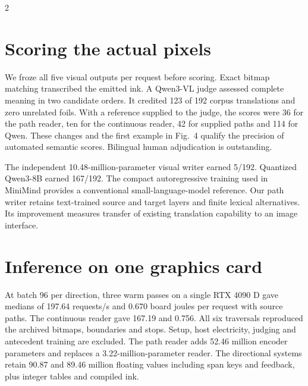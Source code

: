 \documentclass[10pt,a4paper]{article}
\newcommand{\pageheading}[1]{\noindent{\sffamily\bfseries\fontsize{17}{20}\selectfont #1\par}\vspace{4pt}}
\begin{document}
\begin{multicols}{2}
\section*{Scoring the actual pixels}
We froze all five visual outputs per request before scoring. Exact bitmap matching transcribed the emitted ink. A Qwen3-VL judge assessed complete meaning in two candidate orders. It credited 123 of 192 corpus translations and zero unrelated foils. With a reference supplied to the judge, the scores were 36 for the path reader, ten for the continuous reader, 42 for supplied paths and 114 for Qwen. These changes and the first example in Fig.~4 qualify the precision of automated semantic scores. Bilingual human adjudication is outstanding.

The independent 10.48-million-parameter visual writer earned 5/192. Quantized Qwen3-8B earned 167/192. The compact autoregressive training used in MiniMind provides a conventional small-language-model reference.\cite{mini} Our path writer retains text-trained source and target layers and finite lexical alternatives. Its improvement measures transfer of existing translation capability to an image interface.

\section*{Inference on one graphics card}
At batch 96 per direction, three warm passes on a single RTX 4090 D gave medians of 197.64 requests/s and 0.670 board joules per request with source paths. The continuous reader gave 167.19 and 0.756. All six traversals reproduced the archived bitmaps, boundaries and stops. Setup, host electricity, judging and antecedent training are excluded. The path reader adds 52.46 million encoder parameters and replaces a 3.22-million-parameter reader. The directional systems retain 90.87 and 89.46 million floating values including span keys and feedback, plus integer tables and compiled ink.
\end{multicols}
\newpage
\pageheading{What exact visual reading can repair}
\end{document}
